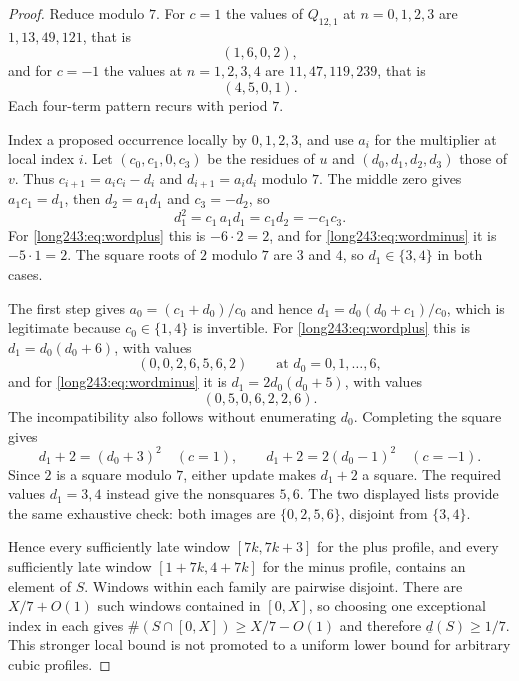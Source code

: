 \begin{proof}
Reduce modulo $7$.  For $c=1$ the values of $Q_{12,1}$ at $n=0,1,2,3$ are
$1,13,49,121$, that is
\begin{equation}\label{long243:eq:wordplus}
 (1,6,0,2),
\end{equation}
and for $c=-1$ the values at $n=1,2,3,4$ are $11,47,119,239$, that is
\begin{equation}\label{long243:eq:wordminus}
 (4,5,0,1).
\end{equation}
Each four-term pattern recurs with period $7$.

Index a proposed occurrence locally by $0,1,2,3$, and use $a_i$ for the
multiplier at local index $i$. Let $(c_0,c_1,0,c_3)$ be the residues of
$u$ and $(d_0,d_1,d_2,d_3)$ those of $v$. Thus
$c_{i+1}=a_ic_i-d_i$ and $d_{i+1}=a_id_i$ modulo $7$.  The middle zero gives
$a_1c_1=d_1$, then $d_2=a_1d_1$ and $c_3=-d_2$, so
\begin{equation}\label{long243:eq:d1square}
 d_1^2=c_1\,a_1d_1=c_1d_2=-c_1c_3 .
\end{equation}
For \eqref{long243:eq:wordplus} this is $-6\cdot2=2$, and for \eqref{long243:eq:wordminus} it
is $-5\cdot1=2$.  The square roots of $2$ modulo $7$ are $3$ and $4$, so
$d_1\in\{3,4\}$ in both cases.

The first step gives $a_0=(c_1+d_0)/c_0$ and hence
$d_1=d_0(d_0+c_1)/c_0$, which is legitimate because $c_0\in\{1,4\}$ is
invertible.  For \eqref{long243:eq:wordplus} this is $d_1=d_0(d_0+6)$, with values
\[
 (0,0,2,6,5,6,2) \qquad\text{at } d_0=0,1,\ldots,6,
\]
and for \eqref{long243:eq:wordminus} it is $d_1=2d_0(d_0+5)$, with values
\[
 (0,5,0,6,2,2,6).
\]
The incompatibility also follows without enumerating $d_0$. Completing
the square gives
\[
 d_1+2=(d_0+3)^2\quad(c=1),\qquad
 d_1+2=2(d_0-1)^2\quad(c=-1).
\]
Since $2$ is a square modulo $7$, either update makes $d_1+2$ a square.
The required values $d_1=3,4$ instead give the nonsquares $5,6$.
The two displayed lists provide the same exhaustive check: both images
are $\{0,2,5,6\}$, disjoint from $\{3,4\}$.

Hence every sufficiently late window $[7k,7k+3]$ for the plus profile,
and every sufficiently late window $[1+7k,4+7k]$ for the minus profile,
contains an element of $S$. Windows within each family are pairwise disjoint.
There are $X/7+O(1)$ such windows contained in $[0,X]$, so choosing one
exceptional index in each gives $\#(S\cap[0,X])\ge X/7-O(1)$ and therefore
$\underline d(S)\ge1/7$. This stronger local bound is not promoted to a
uniform lower bound for arbitrary cubic profiles.
\end{proof}

